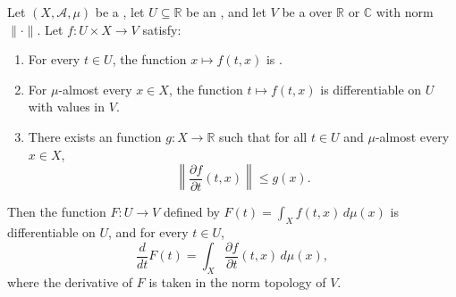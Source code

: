 \begin{theorem} \label{theorem:leibniz_rule_for_bochner_integrals_with_real_parameter}
    Let $(X, \mathcal{A}, \mu)$ be a , let $U \subseteq \mathbb{R}$ be an , and let $V$ be a  over $\mathbb{R}$ or $\mathbb{C}$ with norm $\|\cdot\|$. Let $f : U \times X \to V$ satisfy:
    \begin{enumerate}
        \item For every $t \in U$, the function $x \mapsto f(t, x)$ is .
        \item For $\mu$-almost every $x \in X$, the function $t \mapsto f(t, x)$ is differentiable on $U$ with values in $V$.
        \item There exists an  function $g : X \to \mathbb{R}$ such that for all $t \in U$ and $\mu$-almost every $x \in X$,
        $$\left\| \frac{\partial f}{\partial t}(t, x) \right\| \le g(x).$$
    \end{enumerate}

    Then the function $F : U \to V$ defined by $F(t) = \int_X f(t, x) \, d\mu(x)$ is differentiable on $U$, and for every $t \in U$,
    $$\frac{d}{dt} F(t) = \int_X \frac{\partial f}{\partial t}(t, x) \, d\mu(x),$$
    where the derivative of $F$ is taken in the norm topology of $V$.
\end{theorem}
